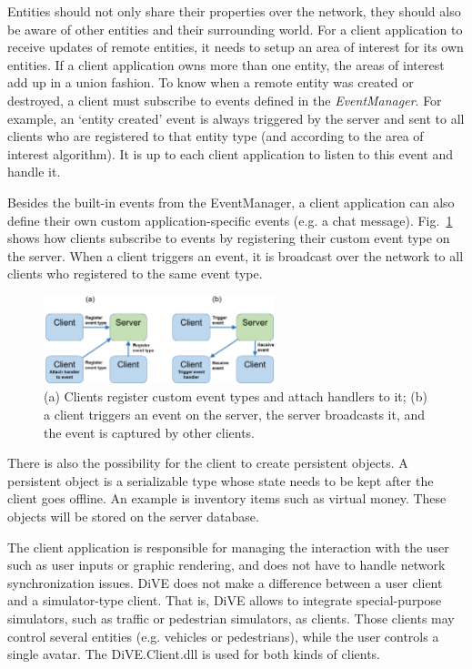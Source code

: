 \documentclass[]{elsarticle}
\begin{document}
Entities should not only share their properties over the network, they should also be aware of other entities and their surrounding world. For a client application to receive updates of remote entities, it needs to setup an area of interest for its own entities. If a client application owns more than one entity, the areas of interest add up in a union fashion. To know when a remote entity was created or destroyed, a client must subscribe to events defined in the \textit{EventManager}. For example, an `entity created' event is always triggered by the server and sent to all clients who are registered to that entity type (and according to the area of interest algorithm). It is up to each client application to listen to this event and handle it.


Besides the built-in events from the EventManager, a client application can also define their own custom application-specific events (e.g. a chat message). Fig.~\ref{fig:event_spreading} shows how clients subscribe to events by registering their custom event type on the server. When a client triggers an event, it is broadcast over the network to all clients who registered to the same event type.

\begin{figure}[h]
\centering
\includegraphics[width=0.6\textwidth]{acm-vrst13-img/server_request.png}
\caption{(a) Clients register custom event types and attach handlers to it; (b) a client triggers an event on the server, the server broadcasts it, and the event is captured by other clients.}
\label{fig:event_spreading}
\end{figure}

There is also the possibility for the client to create persistent objects. A persistent object is a serializable type whose state needs to be kept after the client goes offline. An example is inventory items such as virtual money. These objects will be stored on the server database.

The client application is responsible for managing the interaction with the user such as user inputs or graphic rendering, and does not have to handle network synchronization issues.
DiVE does not make a difference between a user client and a simulator-type client. That is, DiVE allows to integrate special-purpose simulators, such as traffic or pedestrian simulators, as clients. Those clients may control several entities (e.g. vehicles or pedestrians), while the user controls a single avatar. The DiVE.Client.dll is used for both kinds of clients.
\end{document}
